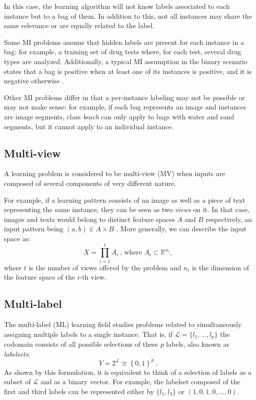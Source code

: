 \documentclass[
	fontsize=11pt, %
	twoside=false, %
	open=any, %
	secnumdepth=1, %
]{kaobook}
\begin{document}
In this case, the learning algorithm will not know labels associated to each instance but to a bag of them. In addition to this, not all instances may share the same relevance or are equally related to the label.

Some MI problems assume that hidden labels are present for each instance in a bag: for example, a training set of drug tests where, for each test, several drug types are analyzed. Additionally, a typical MI assumption in the binary scenario states that a bag is positive when at least one of its instances is positive, and it is negative otherwise \cite{mil-assumptions}.

Other MI problems differ in that a per-instance labeling may not be possible or may not make sense: for example, if each bag represents an image and instances are image segments, class \emph{beach} can only apply to bags with water and sand segments, but it cannot apply to an individual instance.


\subsection{Multi-view}
\label{sec:mview}

A learning problem is considered to be multi-view (MV) \cite{mviewl} when inputs are composed of several components of very different nature. 

For example, if a learning pattern consists of an image as well as a piece of text representing the same instance, they can be seen as two \emph{views} on it. In that case, images and texts would belong to distinct feature spaces $A$ and $B$ respectively, an input pattern being $(a,b)\in A\times B$ . More generally, we can describe the input space as:
\begin{equation}
  X=\prod_{i=1}^{t}A_{i}~\mbox{, where }A_i\subset\mathbb R^{n_i},
  \end{equation}
where $t$ is the number of views offered by the problem and $n_i$ is the dimension of the feature space of the $i$-th view.

\subsection{Multi-label}
\label{sec:mlabel}

The multi-label (ML) learning field \cite{mlc,mltutorial} studies problems related to simultaneously assigning multiple labels to a single instance. That is, if $\mathcal L = \{l_1,\dots,l_p\}$ the codomain consists of all possible selections of these $p$ labels, also known as \emph{labelsets}:
\begin{equation}
  Y=2^{\mathcal L}\cong\left\{0,1\right\}^p~.
  \end{equation} 
As shown by this formulation, it is equivalent to think of a selection of labels as a subset of $\mathcal L$ and as a binary vector. For example, the labelset composed of the first and third labels can be represented either by $\{l_1,l_3\}$ or $(1,0,1,0,\dots,0)$.
\end{document}
